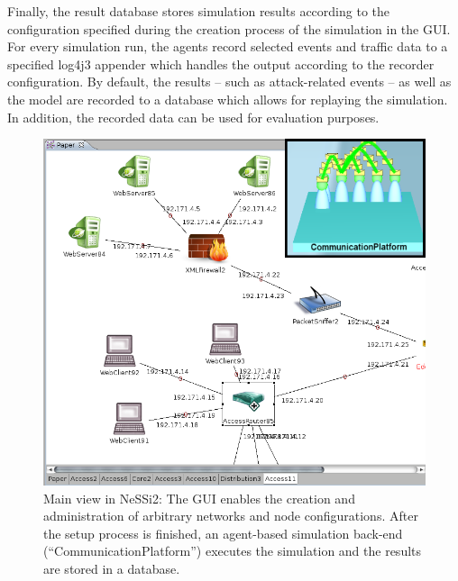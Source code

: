 \documentclass[sigconf]{aamas}
\begin{document}
Finally, the result database stores simulation results according to the configuration specified during the creation process of the simulation in the GUI. For every simulation run, the agents record selected events and traffic data to a specified log4j3 appender which handles the output according to the recorder configuration. By default, the results – such as attack-related events – as well as the model are recorded to a database which allows for replaying the simulation. In addition, the recorded data can be used for
evaluation purposes.

\begin{figure}[h]
  \centering
  \includegraphics[width=\linewidth]{screenshot.png}
  \caption{Main view in NeSSi2: The GUI enables the creation and administration of arbitrary networks and node configurations. After the setup process is finished, an agent-based simulation back-end (“CommunicationPlatform”) executes the simulation and the results are stored in a database.}
  \label{fig:screenshot}
\end{figure}

\end{document}
